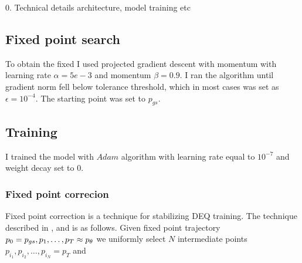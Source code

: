 \documentclass[a4paper,10pt]{report}
\begin{document}
0. Technical details
    architecture,
    model
    training
    etc
\subsection{Fixed point search}
To obtain the fixed I used projected gradient descent with momentum with learning rate $\alpha = 5e-3$ and momentum $\beta = 0.9$. I ran the algorithm until gradient norm fell below tolerance threshold, which in most cases was set as $\epsilon = 10^{-4}$. The starting point was set to $p_{gs}$.
\subsection{Training}
I trained the model with $Adam$ algorithm with learning rate equal to $10^{-7}$ and weight decay set to $0$.
%

\subsubsection{Fixed point correcion}\label{sec:fpc}
Fixed point correction is a technique for stabilizing DEQ training. The technique described in \cite{opticalflow}, \cite{geng2023torchdeq}
and \cite{burger2025dequify} is as follows. Given fixed point trajectory $p_0= p_{gs}, p_1,\ldots, p_T\approx  p_\theta $ we uniformly select $N$ intermediate points $p_{i_1}, p_{i_2}, \ldots , p_{i_N}=p_T$ and
\end{document}
